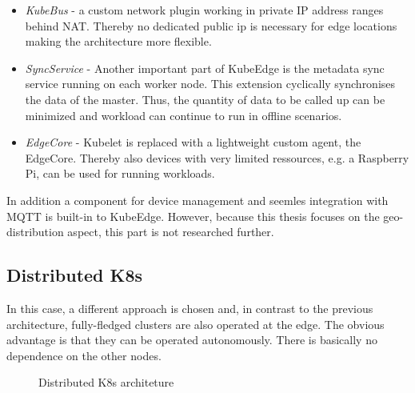 \documentclass[MSC,Master,english]{twbook}%
\begin{document}
\begin{itemize}
    \item \textit{KubeBus} - a custom network plugin working in private \ac{IP} address ranges behind \ac{NAT}. Thereby no dedicated public ip is necessary for edge locations making the architecture more flexible.
    \item \textit{SyncService} - Another important part of KubeEdge is the metadata sync service running on each worker node. This extension cyclically synchronises the data of the master. Thus, the quantity of data to be called up can be minimized and workload can continue to run in offline scenarios.
    \item \textit{EdgeCore} - Kubelet is replaced with a lightweight custom agent, the EdgeCore. Thereby also devices with very limited ressources, e.g. a Raspberry Pi, can be used for running workloads.
\end{itemize}

In addition a component for device management and seemles integration with \ac{MQTT} is built-in to KubeEdge\cite{hal-kubeedge}. However, because this thesis focuses on the geo-distribution aspect, this part is not researched further.


\subsection{Distributed K8s}
\label{sec:disk8s}
In this case, a different approach is chosen and, in contrast to the previous architecture, fully-fledged clusters are also operated at the edge. The obvious advantage is that they can be operated autonomously. There is basically no dependence on the other nodes.

\begin{figure}[ht]
    \centering
    \caption{Distributed \ac{K8s} architeture}
    \label{fig:distributed-k8s}
\end{figure}
\end{document}
